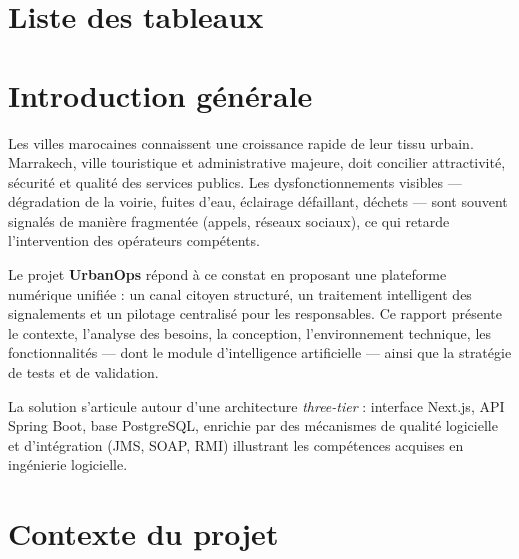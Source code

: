 \documentclass[12pt,a4paper,oneside]{report}
\begin{document}
\chapter*{Liste des tableaux}
\listoftables
\newpage

\tableofcontents
\newpage

\setcounter{page}{1}

\chapter*{Introduction générale}

Les villes marocaines connaissent une croissance rapide de leur tissu urbain. Marrakech, ville touristique et administrative majeure, doit concilier attractivité, sécurité et qualité des services publics. Les dysfonctionnements visibles — dégradation de la voirie, fuites d'eau, éclairage défaillant, déchets — sont souvent signalés de manière fragmentée (appels, réseaux sociaux), ce qui retarde l'intervention des opérateurs compétents.

Le projet \textbf{UrbanOps} répond à ce constat en proposant une plateforme numérique unifiée : un canal citoyen structuré, un traitement intelligent des signalements et un pilotage centralisé pour les responsables. Ce rapport présente le contexte, l'analyse des besoins, la conception, l'environnement technique, les fonctionnalités — dont le module d'intelligence artificielle — ainsi que la stratégie de tests et de validation.

La solution s'articule autour d'une architecture \emph{three-tier} : interface Next.js, API Spring Boot, base PostgreSQL, enrichie par des mécanismes de qualité logicielle et d'intégration (JMS, SOAP, RMI) illustrant les compétences acquises en ingénierie logicielle.

\chapter{Contexte du projet}
\end{document}
